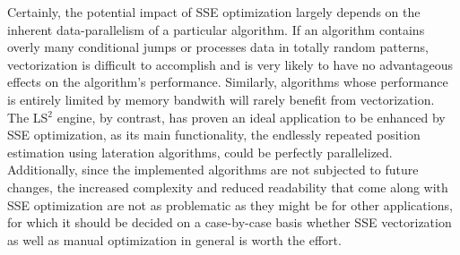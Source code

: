 Certainly, the potential impact of SSE optimization largely depends on the inherent data-parallelism of a particular algorithm. If an algorithm contains overly many conditional jumps or processes data in totally random patterns, vectorization is difficult to accomplish and is very likely to have no advantageous effects on the algorithm's performance. Similarly, algorithms whose performance is entirely limited by memory bandwith will rarely benefit from vectorization. The LS$^{2}$ engine, by contrast, has proven an ideal application to be enhanced by SSE optimization, as its main functionality, the endlessly repeated position estimation using lateration algorithms, could be perfectly parallelized. Additionally, since the implemented algorithms are not subjected to future changes, the increased complexity and reduced readability that come along with SSE optimization are not as problematic as they might be for other applications, for which it should be decided on a case-by-case basis whether SSE vectorization as well as manual optimization in general is worth the effort.
